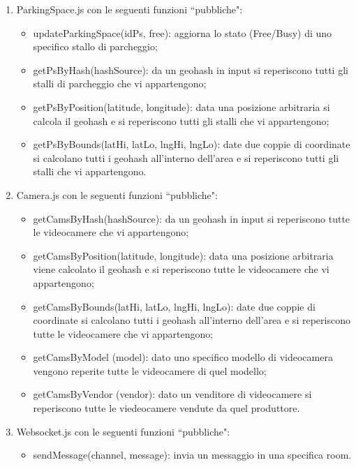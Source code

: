 \begin{enumerate}
	\item ParkingSpace.js con le seguenti funzioni ``pubbliche":
	\begin{itemize}
			\item updateParkingSpace(idPs, free): aggiorna lo stato (Free/Busy) di uno specifico stallo di parcheggio;
			\item getPsByHash(hashSource): da un geohash in input si reperiscono tutti gli stalli di parcheggio che vi appartengono;
			\item getPsByPosition(latitude, longitude): data una posizione arbitraria si calcola il geohash e si reperiscono tutti gli stalli che vi appartengono;
			\item getPsByBounds(latHi, latLo, lngHi, lngLo): date due coppie di coordinate si calcolano tutti i geohash all'interno dell'area e si reperiscono tutti gli stalli che vi appartengono.
		\end{itemize}

	\item Camera.js con le seguenti funzioni ``pubbliche":
	\begin{itemize}
			\item getCamsByHash(hashSource): da un geohash in input si reperiscono tutte le videocamere che vi appartengono;
			\item getCamsByPosition(latitude, longitude): data una posizione arbitraria viene calcolato il geohash e si reperiscono tutte le videocamere che vi appartengono;
			\item getCamsByBounds(latHi, latLo, lngHi, lngLo): date due coppie di coordinate si calcolano tutti i geohash all'interno dell'area e si reperiscono tutte le videocamere che vi appartengono;
			\item getCamsByModel (model): dato uno specifico modello di videocamera vengono reperite tutte le videocamere di quel modello;
			\item getCamsByVendor (vendor): dato un venditore di videocamere si reperiscono tutte le viedeocamere vendute da quel produttore.
	\end{itemize}

	\item Websocket.js con le seguenti funzioni ``pubbliche":
	\begin{itemize}
		\item sendMessage(channel, message): invia un messaggio in una specifica room.
	\end{itemize}
\end{enumerate}


